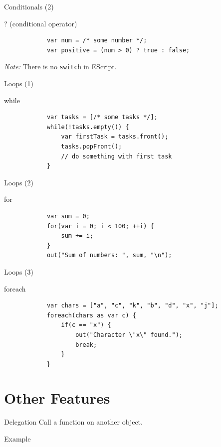 \documentclass[ucs,9pt]{beamer}
\begin{document}
\begin{frame}[fragile]{Conditionals (2)}
	\begin{block}{? (conditional operator)}
		\begin{lstlisting}
			var num = /* some number */;
			var positive = (num > 0) ? true : false;
		\end{lstlisting}
	\end{block}
	\pause
	\vfill
	\emph{Note:} There is no \lstinline!switch! in EScript.
\end{frame}

\begin{frame}[fragile]{Loops (1)}
	\begin{block}{while}
		\begin{lstlisting}
			var tasks = [/* some tasks */];
			while(!tasks.empty()) {
			    var firstTask = tasks.front();
			    tasks.popFront();
			    // do something with first task
			}
		\end{lstlisting}
	\end{block}
\end{frame}

\begin{frame}[fragile]{Loops (2)}
	\begin{block}{for}
		\begin{lstlisting}
			var sum = 0;
			for(var i = 0; i < 100; ++i) {
			    sum += i;
			}
			out("Sum of numbers: ", sum, "\n");
		\end{lstlisting}
	\end{block}
\end{frame}

\begin{frame}[fragile]{Loops (3)}
	\begin{block}{foreach}
		\begin{lstlisting}
			var chars = ["a", "c", "k", "b", "d", "x", "j"];
			foreach(chars as var c) {
			    if(c == "x") {
			        out("Character \"x\" found.");
			        break;
			    }
			}
		\end{lstlisting}
	\end{block}
\end{frame}

\section{Other Features}
\begin{frame}[fragile]{Delegation}
	Call a function on another object.
	\begin{block}{Example}
		
	\end{block}
\end{frame}
\end{document}
